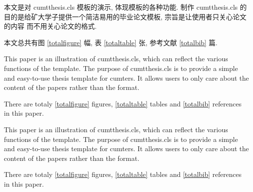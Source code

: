 \documentclass[preprint,authoryear,PhD]{cumtthesis}
\begin{document}
\begin{cabstract}
本文是对 cumtthesis.cls 模板的演示, 体现模板的各种功能. 制作 cumtthesis.cls
的目的是给矿大学子提供一个简洁易用的毕业论文模板, 宗旨是让使用者只关心论文的内容
而不用关心论文的格式.

本文总共有图 \ref{totalfigure} 幅, 表 \ref{totaltable} 张, 参考文献 \ref{totalbib} 篇.

\end{cabstract}

\begin{eabstract}
This paper is an illustration of cumtthesis.cls, which can reflect the various
functions of the template. The purpose of cumtthesis.cls is to provide a
simple and easy-to-use thesis template for cumters. It allows users to only
care about the content of the papers rather than the format.

There are totaly \ref{totalfigure} figures, \ref{totaltable} tables and \ref{totalbib} references
in this paper.

\end{eabstract}

\begin{exabstract}
This paper is an illustration of cumtthesis.cls, which can reflect the various
functions of the template. The purpose of cumtthesis.cls is to provide a
simple and easy-to-use thesis template for cumters. It allows users to only
care about the content of the papers rather than the format.

There are totaly \ref{totalfigure} figures, \ref{totaltable} tables and \ref{totalbib} references
in this paper.

\end{exabstract}




\tableofcontents
\tableofecontents
\end{document}

